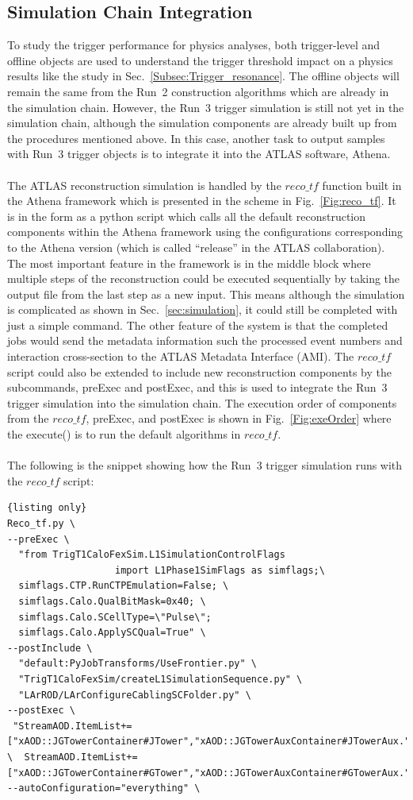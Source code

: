 \subsection{Simulation Chain Integration}
To study the trigger performance for physics analyses, both trigger-level and offline objects are used to understand the trigger threshold impact on a physics results like the study in Sec.~\ref{Subsec:Trigger_resonance}. The offline objects will remain the same from the Run~2 construction algorithms which are already in the simulation chain. However, the Run~3 trigger simulation is still not yet in the simulation chain, although the simulation components are already built up from the procedures mentioned above. In this case, another task to output samples with Run~3 trigger objects is to integrate it into the ATLAS software, Athena.
\\
\\The ATLAS reconstruction simulation is handled by the $reco\_tf$ function built in the Athena framework which is presented in the scheme in Fig.~\ref{Fig:reco_tf}. It is in the form as a python script which calls all the default reconstruction components within the Athena framework using the configurations corresponding to the Athena version (which is called ``release'' in the ATLAS collaboration). The most important feature in the framework is in the middle block where multiple steps of the reconstruction could be executed sequentially by taking the output file from the last step as a new input. This means although the simulation is complicated as shown in Sec.~\ref{sec:simulation}, it could still be completed with just a simple command. The other feature of the system is that the completed jobs would send the metadata information such the processed event numbers and interaction cross-section to the ATLAS Metadata Interface (AMI). The $reco\_tf$ script could also be extended to include new reconstruction components by the subcommands, preExec and postExec, and this is used to integrate the Run~3 trigger simulation into the simulation chain. The execution order of components from the $reco\_tf$, preExec, and postExec is shown in Fig.~\ref{Fig:exeOrder} where the execute() is to run the default algorithms in $reco\_tf$. 
\\
\\The following is the snippet showing how the Run~3 trigger simulation runs with the $reco\_tf$ script:
\\
\begin{lstlisting}{listing only}
Reco_tf.py \
--preExec \
  "from TrigT1CaloFexSim.L1SimulationControlFlags 
                   import L1Phase1SimFlags as simflags;\ 
  simflags.CTP.RunCTPEmulation=False; \
  simflags.Calo.QualBitMask=0x40; \
  simflags.Calo.SCellType=\"Pulse\";
  simflags.Calo.ApplySCQual=True" \
--postInclude \
  "default:PyJobTransforms/UseFrontier.py" \
  "TrigT1CaloFexSim/createL1SimulationSequence.py" \
  "LArROD/LArConfigureCablingSCFolder.py" \
--postExec \
 "StreamAOD.ItemList+=["xAOD::JGTowerContainer#JTower","xAOD::JGTowerAuxContainer#JTowerAux."]; \  StreamAOD.ItemList+=["xAOD::JGTowerContainer#GTower","xAOD::JGTowerAuxContainer#GTowerAux."]";
--autoConfiguration="everything" \
\end{lstlisting}
